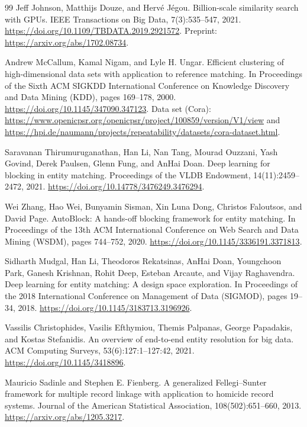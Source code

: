 \documentclass[11pt]{article}
\begin{document}
\begin{thebibliography}{99}
Jeff Johnson, Matthijs Douze, and Herv\'e J\'egou.
\newblock Billion-scale similarity search with GPUs.
\newblock IEEE Transactions on Big Data, 7(3):535--547, 2021.
\newblock \url{https://doi.org/10.1109/TBDATA.2019.2921572}.
\newblock Preprint: \url{https://arxiv.org/abs/1702.08734}.

Andrew McCallum, Kamal Nigam, and Lyle H. Ungar.
\newblock Efficient clustering of high-dimensional data sets with application to reference matching.
\newblock In Proceedings of the Sixth ACM SIGKDD International Conference on Knowledge Discovery and Data Mining (KDD), pages 169--178, 2000.
\newblock \url{https://doi.org/10.1145/347090.347123}.
\newblock Data set (Cora): \url{https://www.openicpsr.org/openicpsr/project/100859/version/V1/view} and \url{https://hpi.de/naumann/projects/repeatability/datasets/cora-dataset.html}.

Saravanan Thirumuruganathan, Han Li, Nan Tang, Mourad Ouzzani, Yash Govind, Derek Paulsen, Glenn Fung, and AnHai Doan.
\newblock Deep learning for blocking in entity matching.
\newblock Proceedings of the VLDB Endowment, 14(11):2459--2472, 2021.
\newblock \url{https://doi.org/10.14778/3476249.3476294}.

Wei Zhang, Hao Wei, Bunyamin Sisman, Xin Luna Dong, Christos Faloutsos, and David Page.
\newblock AutoBlock: A hands-off blocking framework for entity matching.
\newblock In Proceedings of the 13th ACM International Conference on Web Search and Data Mining (WSDM), pages 744--752, 2020.
\newblock \url{https://doi.org/10.1145/3336191.3371813}.

Sidharth Mudgal, Han Li, Theodoros Rekatsinas, AnHai Doan, Youngchoon Park, Ganesh Krishnan, Rohit Deep, Esteban Arcaute, and Vijay Raghavendra.
\newblock Deep learning for entity matching: A design space exploration.
\newblock In Proceedings of the 2018 International Conference on Management of Data (SIGMOD), pages 19--34, 2018.
\newblock \url{https://doi.org/10.1145/3183713.3196926}.

Vassilis Christophides, Vasilis Efthymiou, Themis Palpanas, George Papadakis, and Kostas Stefanidis.
\newblock An overview of end-to-end entity resolution for big data.
\newblock ACM Computing Surveys, 53(6):127:1--127:42, 2021.
\newblock \url{https://doi.org/10.1145/3418896}.

Mauricio Sadinle and Stephen E. Fienberg.
\newblock A generalized Fellegi--Sunter framework for multiple record linkage with application to homicide record systems.
\newblock Journal of the American Statistical Association, 108(502):651--660, 2013.
\newblock \url{https://arxiv.org/abs/1205.3217}.


\end{thebibliography}
\end{document}
